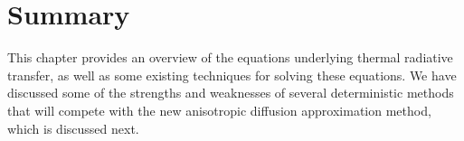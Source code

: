 \section{Summary}

This chapter provides an overview of the equations underlying thermal
radiative transfer, as well as some existing techniques for solving these
equations. We have discussed some of the strengths and weaknesses of several
deterministic methods that will compete with the new anisotropic diffusion
approximation method, which is discussed next.

